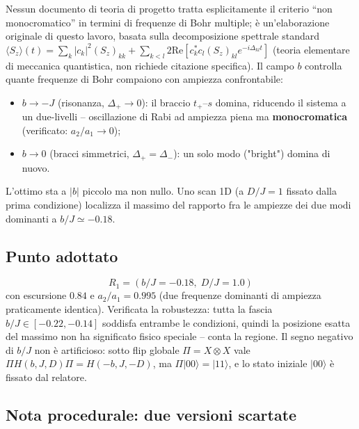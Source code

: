 \documentclass[11pt,a4paper]{article}
\begin{document}
Nessun documento di teoria di progetto tratta esplicitamente il criterio
``non monocromatico'' in termini di frequenze di Bohr multiple; è
un'elaborazione originale di questo lavoro, basata sulla decomposizione
spettrale standard $\langle S_z\rangle(t)=\sum_k|c_k|^2(S_z)_{kk}+\sum_{k<l}2\mathrm{Re}[c_k^*c_l(S_z)_{kl}e^{-i\Delta_{kl}t}]$
(teoria elementare di meccanica quantistica, non richiede citazione
specifica). Il campo $b$ controlla quante frequenze di Bohr compaiono con
ampiezza confrontabile:
\begin{itemize}
\item $b\to-J$ (risonanza, $\Delta_+\to0$): il braccio $t_+$--$s$ domina,
riducendo il sistema a un due-livelli -- oscillazione di Rabi ad ampiezza
piena ma \textbf{monocromatica} (verificato: $a_2/a_1\to0$);
\item $b\to0$ (bracci simmetrici, $\Delta_+=\Delta_-$): un solo modo
("bright") domina di nuovo.
\end{itemize}
L'ottimo sta a $|b|$ piccolo ma non nullo. Uno scan 1D (a $D/J=1$ fissato
dalla prima condizione) localizza il massimo del rapporto fra le ampiezze
dei due modi dominanti a $b/J\simeq-0.18$.

\subsection{Punto adottato}

$$\boxed{R_1 = (b/J=-0.18,\; D/J=1.0)}$$
con escursione $0.84$ e $a_2/a_1=0.995$ (due frequenze dominanti di
ampiezza praticamente identica). Verificata la robustezza: tutta la fascia
$b/J\in[-0.22,-0.14]$ soddisfa entrambe le condizioni, quindi la posizione
esatta del massimo non ha significato fisico speciale -- conta la regione.
Il segno negativo di $b/J$ non è artificioso: sotto flip globale
$\Pi=X\otimes X$ vale $\Pi H(b,J,D)\Pi=H(-b,J,-D)$, ma $\Pi|00\rangle=|11\rangle$,
e lo stato iniziale $|00\rangle$ è fissato dal relatore.

\subsection{Nota procedurale: due versioni scartate}
\end{document}

